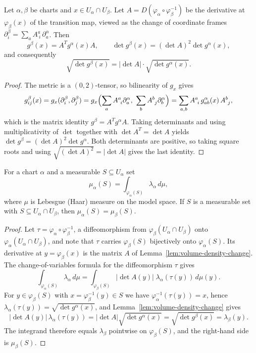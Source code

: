 \begin{lemma}
\label{lem:volume-density-change}
\leanok
Let $\alpha,\beta$ be charts and $x\in U_\alpha\cap U_\beta$. Let
$A=D(\varphi_\alpha\circ\varphi_\beta^{-1})$ be the derivative at $\varphi_\beta(x)$ of the
transition map, viewed as the change of coordinate frames
$\partial^\beta_i=\sum_a A^a_{\ i}\,\partial^\alpha_a$. Then
$$g^\beta(x)=A^{T}g^\alpha(x)A,\qquad
\det g^\beta(x)=(\det A)^2\det g^\alpha(x),$$
and consequently
$$\sqrt{\det g^\beta(x)}=\lvert\det A\rvert\cdot\sqrt{\det g^\alpha(x)}.$$
\end{lemma}

\begin{proof}
\leanok
The metric is a $(0,2)$-tensor, so bilinearity of $g_x$ gives
$$g^\beta_{ij}(x)=g_x(\partial^\beta_i,\partial^\beta_j)
=g_x\Bigl(\sum_a A^a_{\ i}\partial^\alpha_a,\ \sum_b A^b_{\ j}\partial^\alpha_b\Bigr)
=\sum_{a,b}A^a_{\ i}\,g^\alpha_{ab}(x)\,A^b_{\ j},$$
which is the matrix identity $g^\beta=A^{T}g^\alpha A$. Taking determinants and using
multiplicativity of $\det$ together with $\det A^{T}=\det A$ yields
$\det g^\beta=(\det A)^2\det g^\alpha$. Both determinants are positive, so taking square
roots and using $\sqrt{(\det A)^2}=\lvert\det A\rvert$ gives the last identity.
\end{proof}

\begin{lemma}
\label{lem:riemannian-measure-well-defined}
\leanok
For a chart $\alpha$ and a measurable $S\subseteq U_\alpha$ set
$$\mu_\alpha(S)=\int_{\varphi_\alpha(S)}\lambda_\alpha\,d\mu ,$$
where $\mu$ is Lebesgue (Haar) measure on the model space. If $S$ is a measurable set with
$S\subseteq U_\alpha\cap U_\beta$, then $\mu_\alpha(S)=\mu_\beta(S)$.
\end{lemma}

\begin{proof}
\leanok
Let $\tau=\varphi_\alpha\circ\varphi_\beta^{-1}$, a diffeomorphism from
$\varphi_\beta(U_\alpha\cap U_\beta)$ onto $\varphi_\alpha(U_\alpha\cap U_\beta)$, and note
that $\tau$ carries $\varphi_\beta(S)$ bijectively onto $\varphi_\alpha(S)$. Its derivative
at $y=\varphi_\beta(x)$ is the matrix $A$ of Lemma~\ref{lem:volume-density-change}. The
change-of-variables formula for the diffeomorphism $\tau$ gives
$$\int_{\varphi_\alpha(S)}\lambda_\alpha\,d\mu
=\int_{\varphi_\beta(S)}\lvert\det A(y)\rvert\;\lambda_\alpha(\tau(y))\,d\mu(y).$$
For $y\in\varphi_\beta(S)$ with $x=\varphi_\beta^{-1}(y)\in S$ we have
$\varphi_\alpha^{-1}(\tau(y))=x$, hence
$\lambda_\alpha(\tau(y))=\sqrt{\det g^\alpha(x)}$, and Lemma~\ref{lem:volume-density-change}
gives
$$\lvert\det A(y)\rvert\,\lambda_\alpha(\tau(y))
=\lvert\det A\rvert\sqrt{\det g^\alpha(x)}=\sqrt{\det g^\beta(x)}=\lambda_\beta(y).$$
The integrand therefore equals $\lambda_\beta$ pointwise on $\varphi_\beta(S)$, and the
right-hand side is $\mu_\beta(S)$.
\end{proof}

